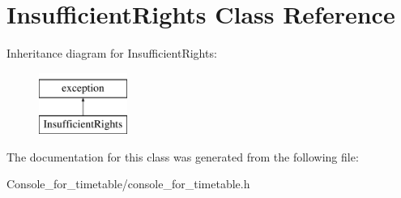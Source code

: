 \hypertarget{class_insufficient_rights}{}\section{Insufficient\+Rights Class Reference}
\label{class_insufficient_rights}
Inheritance diagram for Insufficient\+Rights\+:\begin{figure}[H]
\begin{center}
\leavevmode
\includegraphics[height=2.000000cm]{class_insufficient_rights}
\end{center}
\end{figure}


The documentation for this class was generated from the following file\+:\begin{DoxyCompactItemize}
\item 
Console\+\_\+for\+\_\+timetable/console\+\_\+for\+\_\+timetable.\+h\end{DoxyCompactItemize}
